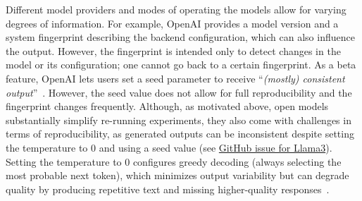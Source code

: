 \documentclass[smallextended]{svjour3}
\newcommand*{\enq}[1]{\enquote{{\itshape#1}}}
\begin{document}
Different model providers and modes of operating the models allow for varying degrees of information.
For example, OpenAI provides a model version and a system fingerprint describing the backend configuration, which can also influence the output.
However, the fingerprint is intended only to detect changes in the model or its configuration; one cannot go back to a certain fingerprint.
As a beta feature, OpenAI lets users set a seed parameter to receive \enq{(mostly) consistent output}~\cite{OpenAI23}.
However, the seed value does not allow for full reproducibility and the fingerprint changes frequently. 
Although, as motivated above, open models substantially simplify re-running experiments, they also come with challenges in terms of reproducibility, as generated outputs can be inconsistent despite setting the temperature to 0 and using a seed value (see \href{https://github.com/ollama/ollama/issues/5321}{GitHub issue for Llama3}).
Setting the temperature to 0 configures greedy decoding (always selecting the most probable next token), which minimizes output variability but can degrade quality by producing repetitive text and missing higher-quality responses~\cite{DBLP:conf/iclr/HoltzmanBDFC20}.
\end{document}
